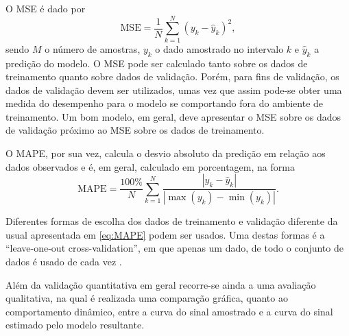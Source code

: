 O MSE é dado por
\begin{equation}
\label{eq:MSE}
   \text{MSE} = \frac{1}{N}\sum_{k=1}^{N}(y_k-\hat{y}_k)^2,
\end{equation}
sendo $M$ o número de amostras, $y_k$ o dado amostrado no intervalo $k$ e $\hat{y}_k$ a predição do modelo. O MSE pode ser calculado tanto sobre os dados de treinamento quanto sobre dados de validação. Porém, para fins de validação, os dados de validação devem ser utilizados, umas vez que assim pode-se obter uma medida do desempenho para o modelo se comportando fora do ambiente de treinamento. Um bom modelo, em geral, deve apresentar o MSE sobre os dados de validação próximo ao MSE sobre os dados de treinamento. 

O MAPE, por sua vez, calcula o desvio absoluto da predição em relação aos dados observados e é, em geral, calculado em porcentagem, na forma
\begin{equation}
\label{eq:MAPE}
   \text{MAPE} =  \frac{100\%}{N}\sum_{k=1}^{N} \frac{|y_k - \hat{y}_k|}{|\max(y_k)-\min(y_k)|}.
\end{equation}

Diferentes formas de escolha dos dados de treinamento e validação diferente da usual apresentada em \eqref{eq:MAPE} podem ser usados.
Uma destas formas é a “leave-one-out cross-validation”, em que apenas um dado, de todo o conjunto de dados é usado de cada vez \citep{allen1974}.

Além da validação quantitativa em geral recorre-se ainda a uma avaliação qualitativa, na qual é realizada uma comparação gráfica, quanto ao comportamento dinâmico, entre a curva do sinal amostrado e a curva do sinal estimado pelo modelo resultante.







